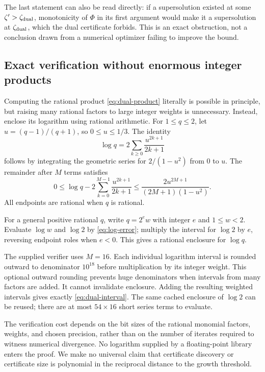 \documentclass[11pt,a4paper]{article}
\theoremstyle{definition}
\theoremstyle{remark}
\begin{document}
The last statement can also be read directly: if a supersolution existed at
some $\zeta'>\zeta_{\rm dual}$, monotonicity of $\Phi$ in its first argument
would make it a supersolution at $\zeta_{\rm dual}$, which the dual
certificate forbids. This is an exact obstruction, not a conclusion drawn
from a numerical optimizer failing to improve the bound.

\subsection{Exact verification without enormous integer products}
Computing the rational product \eqref{eq:dual-product} literally is possible
in principle, but raising many rational factors to large integer weights is
unnecessary. Instead, enclose its logarithm using rational arithmetic.
For $1\leq q\leq2$, let $u=(q-1)/(q+1)$, so $0\leq u\leq1/3$. The identity
\[
 \log q=2\sum_{k\geq0}\frac{u^{2k+1}}{2k+1}
\]
follows by integrating the geometric series for $2/(1-u^2)$ from $0$ to $u$.
The remainder after $M$ terms satisfies
\begin{equation}\label{eq:log-error}
 0\leq \log q-2\sum_{k=0}^{M-1}\frac{u^{2k+1}}{2k+1}
 \leq\frac{2u^{2M+1}}{(2M+1)(1-u^2)}.
\end{equation}
All endpoints are rational when $q$ is rational.

For a general positive rational $q$, write $q=2^e w$ with integer $e$ and
$1\leq w<2$. Evaluate $\log w$ and $\log2$ by
\eqref{eq:log-error}; multiply the interval for $\log2$ by $e$, reversing
endpoint roles when $e<0$. This gives a rational enclosure for $\log q$.

The supplied verifier uses $M=16$. Each individual logarithm interval is
rounded outward to denominator $10^{18}$ before multiplication by its
integer weight. This optional outward rounding prevents huge denominators
when intervals from many factors are added. It cannot invalidate enclosure.
Adding the resulting weighted intervals gives exactly
\eqref{eq:dual-interval}. The same cached enclosure of $\log2$ can be reused;
there are at most $54\times16$ short series terms to evaluate.

The verification cost depends on the bit sizes of the rational monomial
factors, weights, and chosen precision, rather than on the number of iterates
required to witness numerical divergence. No logarithm supplied by a
floating-point library enters the proof. We make no universal claim that
certificate discovery or certificate size is polynomial in the reciprocal
distance to the growth threshold.
\end{document}
